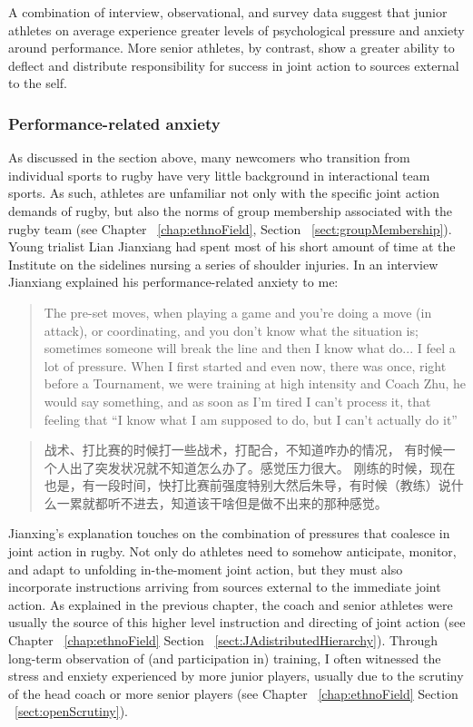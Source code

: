 \begin{CJK}{UTF8}{gbsn}
A combination of interview, observational, and survey data suggest that junior athletes on average experience greater levels of psychological pressure and anxiety around performance.  More senior athletes, by contrast, show a greater ability to deflect and distribute responsibility for success in joint action to sources external to the self.

\subsubsection{Performance-related anxiety}
As discussed in the section above, many newcomers who transition from  individual sports to rugby have very little background in interactional team sports.  As such, athletes are unfamiliar not only with the specific joint action demands of rugby, but also the norms of group membership associated with the rugby team (see Chapter ~\ref{chap:ethnoField}, Section ~\ref{sect:groupMembership}).  Young trialist Lian Jianxiang had spent most of his short amount of time at the Institute on the sidelines nursing a series of shoulder injuries. In an interview Jianxiang explained his performance-related anxiety to me:

    \begin{quote}
      The pre-set moves, when playing a game and you’re doing a move (in attack), or coordinating, and you don’t know what the situation is; sometimes someone will break the line and then I know what do... I feel a lot of pressure.  When I first started and even now, there was once, right before a Tournament, we were training at high intensity and Coach Zhu, he would say something, and as soon as I'm tired I can't process it, that feeling that ``I know what I am supposed to do, but I can't actually do it''
    \end{quote}

    \begin{quote}
      战术、打比赛的时候打一些战术，打配合，不知道咋办的情况， 有时候一个人出了突发状况就不知道怎么办了。感觉压力很大。 刚练的时候，现在也是，有一段时间，快打比赛前强度特别大然后朱导，有时候（教练）说什么一累就都听不进去，知道该干啥但是做不出来的那种感觉。
    \end{quote}

Jianxing's explanation touches on the combination of pressures that coalesce in joint action in rugby.  Not only do athletes need to somehow anticipate, monitor, and adapt to unfolding in-the-moment joint action, but they must also incorporate instructions arriving from sources external to the immediate joint action.  As explained in the previous chapter, the coach and senior athletes were usually the source of this higher level instruction and directing of joint action (see Chapter ~\ref{chap:ethnoField} Section ~\ref{sect:JAdistributedHierarchy}).  Through long-term observation of (and participation in) training, I often witnessed the stress and enxiety experienced by more junior players, usually due to the scrutiny of the head coach or more senior players (see Chapter ~\ref{chap:ethnoField} Section ~\ref{sect:openScrutiny}).


\end{CJK}
